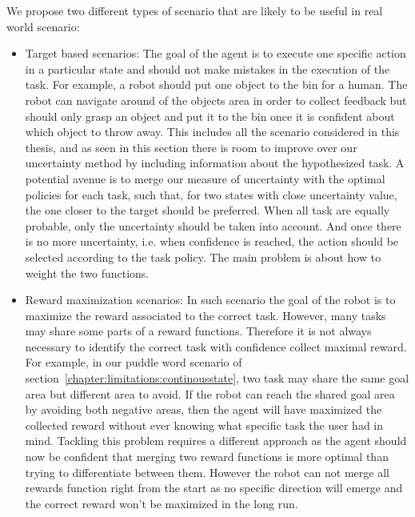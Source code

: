 We propose two different types of scenario that are likely to be useful in real world scenario: 
\begin{itemize}
\item Target based scenarios: The goal of the agent is to execute one specific action in a particular state and should not make mistakes in the execution of the task. For example, a robot should put one object to the bin for a human. The robot can navigate around of the objects area in order to collect feedback but should only grasp an object and put it to the bin once it is confident about which object to throw away. This includes all the scenario considered in this thesis, and as seen in this section there is room to improve over our uncertainty method by including information about the hypothesized task. A potential avenue is to merge our measure of uncertainty with the optimal policies for each task, such that, for two states with close uncertainty value, the one closer to the target should be preferred. When all task are equally probable, only the uncertainty should be taken into account. And once there is no more uncertainty, i.e. when confidence is reached, the action should be selected according to the task policy. The main problem is about how to weight the two functions.

\item Reward maximization scenarios: In such scenario the goal of the robot is to maximize the reward associated to the correct task. However, many tasks may share some parts of a reward functions. Therefore it is not always necessary to identify the correct task with confidence collect maximal reward. For example, in our puddle word scenario of section~\ref{chapter:limitations:continousstate}, two task may share the same goal area but different area to avoid. If the robot can reach the shared goal area by avoiding both negative areas, then the agent will have maximized the collected reward without ever knowing what specific task the user had in mind. Tackling this problem requires a different approach as the agent should now be confident that merging two reward functions is more optimal than trying to differentiate between them. However the robot can not merge all rewards function right from the start as no specific direction will emerge and the correct reward won't be maximized in the long run. 
\end{itemize}